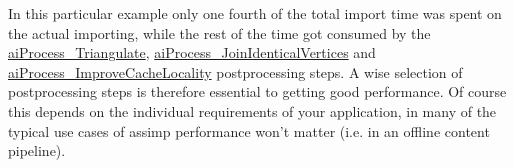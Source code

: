 In this particular example only one fourth of the total import time was spent on the actual importing, while the rest of the time got consumed by the \hyperlink{postprocess_8h_a64795260b95f5a4b3f3dc1be4f52e410a9c3de834f0307f31fa2b1b6d05dd592b}{ai\+Process\+\_\+\+Triangulate}, \hyperlink{postprocess_8h_a64795260b95f5a4b3f3dc1be4f52e410a444a6c9d8b63e6dc9e1e2e1edd3cbcd4}{ai\+Process\+\_\+\+Join\+Identical\+Vertices} and \hyperlink{postprocess_8h_a64795260b95f5a4b3f3dc1be4f52e410a16979c68f93d283c6886abf580d557b1}{ai\+Process\+\_\+\+Improve\+Cache\+Locality} postprocessing steps. A wise selection of postprocessing steps is therefore essential to getting good performance. Of course this depends on the individual requirements of your application, in many of the typical use cases of assimp performance won't matter (i.\+e. in an offline content pipeline). 